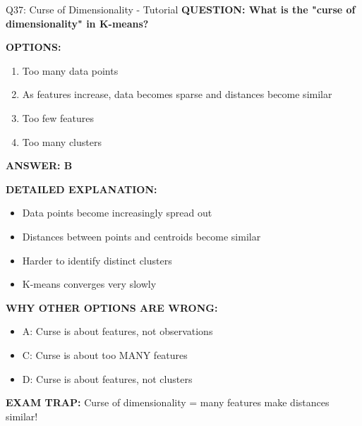 \documentclass[8pt]{beamer}
\begin{document}
	\begin{frame}{Q37: Curse of Dimensionality - Tutorial}
		\fontsize{6.5}{7.5}\selectfont
		\textbf{QUESTION: What is the "curse of dimensionality" in K-means?}
		
		\vspace{0.1cm}
		\textbf{OPTIONS:}
		\begin{enumerate}
			\item Too many data points
			\item As features increase, data becomes sparse and distances become similar
			\item Too few features
			\item Too many clusters
		\end{enumerate}
		
		\vspace{0.1cm}
		\textcolor{myblue}{\textbf{ANSWER: B}}
		
		\vspace{0.1cm}
		\textbf{DETAILED EXPLANATION:}
		\begin{itemize}
			\item Data points become increasingly spread out
			\item Distances between points and centroids become similar
			\item Harder to identify distinct clusters
			\item K-means converges very slowly
		\end{itemize}
		
		\vspace{0.1cm}
		\textcolor{myred}{\textbf{WHY OTHER OPTIONS ARE WRONG:}}
		\begin{itemize}
			\item \textcolor{myred}{A:} Curse is about features, not observations
			\item \textcolor{myred}{C:} Curse is about too MANY features
			\item \textcolor{myred}{D:} Curse is about features, not clusters
		\end{itemize}
		
		\textcolor{myred}{\textbf{EXAM TRAP:}} Curse of dimensionality = \textcolor{myblue}{many features make distances similar}!
	\end{frame}
	
\end{document}
